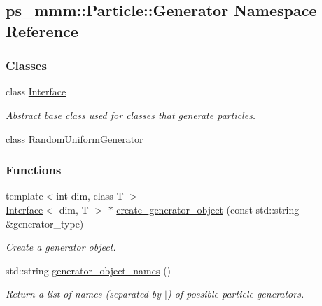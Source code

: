 \hypertarget{namespaceps__mmm_1_1_particle_1_1_generator}{}\subsection{ps\+\_\+mmm\+:\+:Particle\+:\+:Generator Namespace Reference}
\label{namespaceps__mmm_1_1_particle_1_1_generator}
\subsubsection*{Classes}
\begin{DoxyCompactItemize}
\item 
class \hyperlink{classps__mmm_1_1_particle_1_1_generator_1_1_interface}{Interface}
\begin{DoxyCompactList}\small\item\em Abstract base class used for classes that generate particles. \end{DoxyCompactList}\item 
class \hyperlink{classps__mmm_1_1_particle_1_1_generator_1_1_random_uniform_generator}{Random\+Uniform\+Generator}
\end{DoxyCompactItemize}
\subsubsection*{Functions}
\begin{DoxyCompactItemize}
\item 
{\footnotesize template$<$int dim, class T $>$ }\\\hyperlink{classps__mmm_1_1_particle_1_1_generator_1_1_interface}{Interface}$<$ dim, T $>$ $\ast$ \hyperlink{namespaceps__mmm_1_1_particle_1_1_generator_afe60bf37b63313495eb459cf11c071b5}{create\+\_\+generator\+\_\+object} (const std\+::string \&generator\+\_\+type)
\begin{DoxyCompactList}\small\item\em Create a generator object. \end{DoxyCompactList}\item 
std\+::string \hyperlink{namespaceps__mmm_1_1_particle_1_1_generator_a93ad21f27ac5821f6c3a398db128537c}{generator\+\_\+object\+\_\+names} ()
\begin{DoxyCompactList}\small\item\em Return a list of names (separated by \textquotesingle{}$\vert$\textquotesingle{}) of possible particle generators. \end{DoxyCompactList}\end{DoxyCompactItemize}


